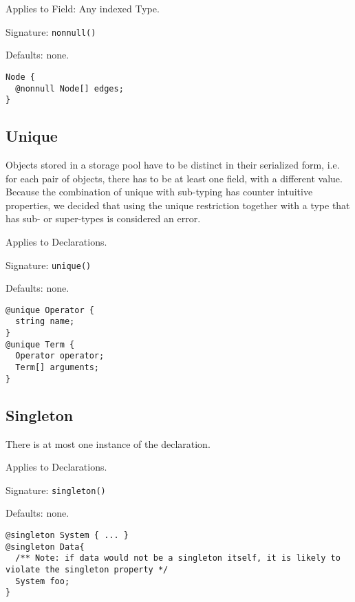 Applies to Field: Any indexed Type.

Signature: \verb/nonnull()/

Defaults: none.

\begin{lstlisting}[label=nonnullExample,caption=Examples,language=skill]
Node {
  @nonnull Node[] edges;
}
\end{lstlisting}


\subsection*{Unique}
Objects stored in a storage pool have to be distinct in their serialized form, i.e. for each pair of objects, there has to be at least one field, with a different value.
Because the combination of unique with sub-typing has counter intuitive properties, we decided that using the unique restriction together with a type that has sub- or super-types is considered an error.

Applies to Declarations.

Signature: \verb/unique()/

Defaults: none.

\begin{lstlisting}[label=uniqueExample,caption=Examples,language=skill]
@unique Operator {
  string name;
}
@unique Term {
  Operator operator;
  Term[] arguments;
}
\end{lstlisting}


\subsection*{Singleton}
There is at most one instance of the declaration.

Applies to Declarations.

Signature: \verb/singleton()/

Defaults: none.

\begin{lstlisting}[label=singletonExample,caption=Examples,language=skill]
@singleton System { ... }
@singleton Data{
  /** Note: if data would not be a singleton itself, it is likely to violate the singleton property */
  System foo;
}
\end{lstlisting}




